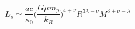 \documentclass[11pt]{article}
\begin{document}
$$
L_{s} \simeq \frac{ac}{\kappa_{0}} \Bigg(\frac{G \mu m_{p}}{k_{B}}\Bigg)^{4+\nu} R^{3\lambda - \nu} M^{3+\nu-\lambda}
$$

\clearpage


%



\end{document}
